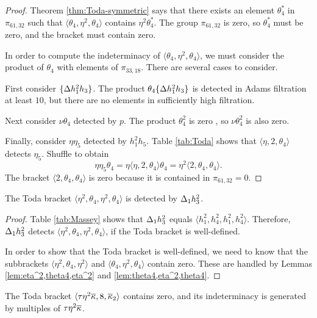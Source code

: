 \begin{proof}
Theorem \ref{thm:Toda-symmetric} says that there exists an element
$\theta_4^*$ in $\pi_{61,32}$ such that
$\langle \theta_4, \eta^2, \theta_4 \rangle$ contains
$\eta^2 \theta_4^*$.
The group $\pi_{61,32}$ is zero, so $\theta_4^*$ must be zero,
and the bracket must contain zero.

In order to compute the indeterminacy of 
$\langle \theta_4, \eta^2, \theta_4 \rangle$, we must consider
the product of $\theta_4$ with elements of $\pi_{33,18}$.
There are several cases to consider.

First consider $\{\Delta h_1^2 h_3\}$.  The product
$\theta_4 \{\Delta h_1^2 h_3\}$ is detected in Adams filtration at least
$10$, but there are no elements in sufficiently high filtration.

Next consider $\nu \theta_4$ detected by $p$.
The product $\theta_4^2$ is zero \cite{Xu16},
so $\nu \theta_4^2$ is also zero.

Finally, consider $\eta \eta_5$ detected by $h_1^2 h_5$.
Table \ref{tab:Toda} shows that $\langle \eta, 2, \theta_4 \rangle$
detects $\eta_5$.
Shuffle to obtain
\[
\eta \eta_5 \theta_4 = \eta \langle \eta, 2, \theta_4 \rangle \theta_4 =
\eta^2 \langle 2, \theta_4, \theta_4 \rangle.
\]
The bracket $\langle 2, \theta_4, \theta_4 \rangle$ is zero
because it is contained in $\pi_{61,32} = 0$.
\end{proof}

\begin{lemma}
\label{lem:eta^2,theta4,eta^2,theta4}
The Toda bracket $\langle \eta^2, \theta_4, \eta^2, \theta_4 \rangle$
is detected by $\Delta_1 h_3^2$.
\end{lemma}

\begin{proof}
Table \ref{tab:Massey} shows that 
$\Delta_1 h_3^2$ equals $\langle h_1^2, h_4^2, h_1^2, h_4^2 \rangle$.
Therefore, $\Delta_1 h_3^2$ detects 
$\langle \eta^2, \theta_4, \eta^2, \theta_4 \rangle$,
if the Toda bracket is well-defined.

In order to show that the Toda bracket is well-defined, we 
need to know that the 
subbrackets $\langle \eta^2, \theta_4, \eta^2 \rangle$
and $\langle \theta_4, \eta^2, \theta_4 \rangle$ contain zero.
These are handled by
Lemmas \ref{lem:eta^2,theta4,eta^2} and \ref{lem:theta4,eta^2,theta4}.
\end{proof}

\begin{lemma}
\label{lem:teta^2kappabar,8,kappabar2}
The Toda bracket 
$\langle \tau \eta^2 \overline{\kappa}, 8, \overline{\kappa}_2 \rangle$
contains zero,
and its indeterminacy is generated by multiples of
$\tau \eta^2 \overline{\kappa}$.
\end{lemma}


